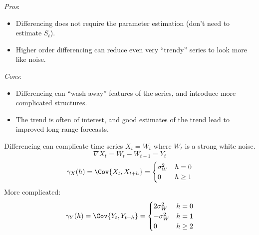 \emph{Pros}:
\begin{itemize}
    \item Differencing does not require the parameter estimation
          (don't need to estimate $ S_t $).
    \item Higher order differencing can reduce even very
          ``trendy'' series to look more like noise.
\end{itemize}
\emph{Cons}:
\begin{itemize}
    \item Differencing can ``wash away'' features of the series,
          and introduce more complicated structures.
    \item The trend is often of interest, and good estimates
          of the trend lead to improved long-range forecasts.
\end{itemize}
\begin{Example}{Differencing can complicate time series}{}
    $ X_t=W_t $ where $ W_t $ is a strong white noise.
    \[ \nabla X_t=W_t-W_{t-1}=Y_t \]
    \[ \gamma_X(h)=\Cov{X_t,X_{t+h}}=\begin{cases}
            \sigma_W^2 & h=0    \\
            0          & h\ge 1
        \end{cases} \]
    More complicated:
    \[ \gamma_Y(h)=\Cov{Y_t,Y_{t+h}}=\begin{cases}
            2\sigma_W^2 & h=0    \\
            -\sigma_W^2 & h=1    \\
            0           & h\ge 2
        \end{cases} \]
\end{Example}
